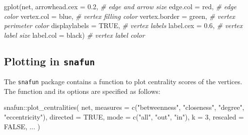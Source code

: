 \documentclass[
]{article}
\newenvironment{Shaded}{\begin{snugshade}}{\end{snugshade}}
\newcommand{\AttributeTok}[1]{\textcolor[rgb]{0.77,0.63,0.00}{#1}}
\newcommand{\CommentTok}[1]{\textcolor[rgb]{0.56,0.35,0.01}{\textit{#1}}}
\newcommand{\ConstantTok}[1]{\textcolor[rgb]{0.00,0.00,0.00}{#1}}
\newcommand{\DecValTok}[1]{\textcolor[rgb]{0.00,0.00,0.81}{#1}}
\newcommand{\FloatTok}[1]{\textcolor[rgb]{0.00,0.00,0.81}{#1}}
\newcommand{\FunctionTok}[1]{\textcolor[rgb]{0.00,0.00,0.00}{#1}}
\newcommand{\NormalTok}[1]{#1}
\newcommand{\SpecialCharTok}[1]{\textcolor[rgb]{0.00,0.00,0.00}{#1}}
\newcommand{\StringTok}[1]{\textcolor[rgb]{0.31,0.60,0.02}{#1}}
\begin{document}
\begin{Shaded}
\begin{Highlighting}[]
\FunctionTok{gplot}\NormalTok{(net,}
      \AttributeTok{arrowhead.cex =} \FloatTok{0.2}\NormalTok{,     }\CommentTok{\# edge and arrow size}
      \AttributeTok{edge.col =} \StringTok{\textquotesingle{}red\textquotesingle{}}\NormalTok{,        }\CommentTok{\# edge color}
      \AttributeTok{vertex.col =} \StringTok{\textquotesingle{}blue\textquotesingle{}}\NormalTok{,     }\CommentTok{\# vertex filling color}
      \AttributeTok{vertex.border =} \StringTok{\textquotesingle{}green\textquotesingle{}}\NormalTok{, }\CommentTok{\# vertex perimeter color}
      \AttributeTok{displaylabels =} \ConstantTok{TRUE}\NormalTok{,    }\CommentTok{\# vertex labels}
      \AttributeTok{label.cex =} \FloatTok{0.6}\NormalTok{,         }\CommentTok{\# vertex label size}
      \AttributeTok{label.col =} \StringTok{\textquotesingle{}black\textquotesingle{}}\NormalTok{)     }\CommentTok{\# vertex label color}
\end{Highlighting}
\end{Shaded}

\hypertarget{plotting-in-snafun}{%
\subsection{\texorpdfstring{Plotting in
\texttt{snafun}}{Plotting in snafun}}\label{plotting-in-snafun}}

The \texttt{snafun} package contains a function to plot centrality
scores of the vertices. The function and its options are specified as
follows:

\begin{Shaded}
\begin{Highlighting}[]
\NormalTok{snafun}\SpecialCharTok{::}\FunctionTok{plot\_centralities}\NormalTok{(}
\NormalTok{  net,}
  \AttributeTok{measures =} \FunctionTok{c}\NormalTok{(}\StringTok{"betweenness"}\NormalTok{, }\StringTok{"closeness"}\NormalTok{, }\StringTok{"degree"}\NormalTok{, }\StringTok{"eccentricity"}\NormalTok{),}
  \AttributeTok{directed =} \ConstantTok{TRUE}\NormalTok{,}
  \AttributeTok{mode =} \FunctionTok{c}\NormalTok{(}\StringTok{"all"}\NormalTok{, }\StringTok{"out"}\NormalTok{, }\StringTok{"in"}\NormalTok{),}
  \AttributeTok{k =} \DecValTok{3}\NormalTok{,}
  \AttributeTok{rescaled =} \ConstantTok{FALSE}\NormalTok{,}
\NormalTok{  ...}
\NormalTok{)}
\end{Highlighting}
\end{Shaded}
\end{document}
